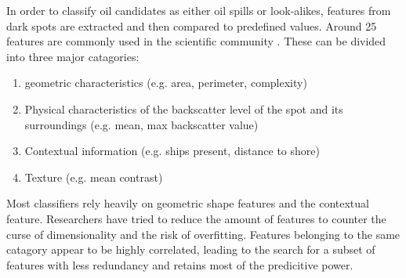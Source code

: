 In order to classify oil candidates as either oil spills or look-alikes, features from dark spots are extracted and then compared to predefined values. Around 25 features are commonly used in the scientific community \cite{Topouzelis200930}. These can be divided into three major catagories\cite{Brekke200595}:
\begin{enumerate}
\item geometric characteristics (e.g. area, perimeter, complexity)
\item Physical characteristics of the backscatter level of the spot and its surroundings (e.g. mean, max backscatter value)
\item Contextual information (e.g. ships present, distance to shore)
\item Texture (e.g. mean contrast)
\end{enumerate}
Most classifiers rely heavily on geometric shape features and the contextual feature.\cite{Xu201414} Researchers have tried to reduce the amount of features to counter the curse of dimensionality and the risk of overfitting. Features belonging to the same catagory appear to be highly correlated\cite{Xu201414}, leading to the search for a subset of features with less redundancy and retains most of the predicitive power\cite{Topouzelis200930}. 
